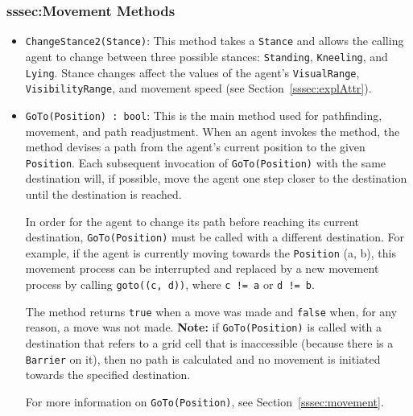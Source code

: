 \documentclass[
  a4paper,
  english,
  DIV=16,
  11pt,
  parskip=half,
  dvipsnames,
  listof=totoc,		     %
  index=totoc,		     %
  bibliography=totoc,	 %
]{scrartcl}
\begin{document}
\subsubsection{sssec:Movement Methods} \label{sssec:movMeth}
\begin{itemize}
  \item \texttt{ChangeStance2(Stance)}: This method takes a \texttt{Stance} and allows the calling agent to change between three possible stances: \texttt{Standing}, \texttt{Kneeling}, and \texttt{Lying}. Stance changes affect the values of the agent's \texttt{VisualRange}, \texttt{VisibilityRange}, and movement speed (see Section~\ref{sssec:explAttr}).
  \item \texttt{GoTo(Position) :~bool}: This is the main method used for pathfinding, movement, and path readjustment. When an agent invokes the method, the method devises a path from the agent's current position to the given \texttt{Position}. Each subsequent invocation of \texttt{GoTo(Position)} with the same destination will, if possible, move the agent one step closer to the destination until the destination is reached.
  
  In order for the agent to change its path before reaching its current destination, \texttt{GoTo(Position)} must be called with a different destination. For example, if the agent is currently moving towards the \texttt{Position} (a, b), this movement process can be interrupted and replaced by a new movement process by calling \texttt{goto((c, d))}, where \texttt{c != a} or \texttt{d != b}.
  
  The method returns \texttt{true} when a move was made and \texttt{false} when, for any reason, a move was not made. \textbf{Note:} if \texttt{GoTo(Position)} is called with a destination that refers to a grid cell that is inaccessible (because there is a \texttt{Barrier} on it), then no path is calculated and no movement is initiated towards the specified destination.
  
  For more information on \texttt{GoTo(Position)}, see Section~\ref{sssec:movement}.
\end{itemize}
%
\end{document}
